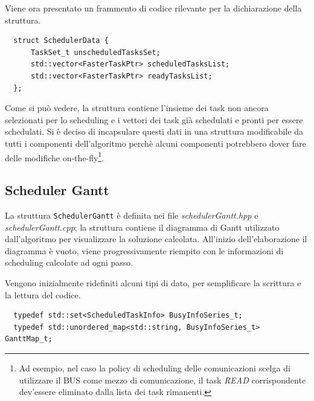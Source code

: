 Viene ora presentato un frammento di codice rilevante per la dichiarazione 
della struttura.
\newline
\begin{verbatim}
  struct SchedulerData {
      TaskSet_t unscheduledTasksSet;
      std::vector<FasterTaskPtr> scheduledTasksList;
      std::vector<FasterTaskPtr> readyTasksList;
  };
\end{verbatim}
Come si può vedere, la struttura contiene l'insieme dei task non ancora 
selezionati per lo scheduling e i vettori dei task già schedulati e pronti per 
essere schedulati. Si è deciso di incapsulare questi dati in una struttura 
modificabile da tutti i componenti dell'algoritmo perchè alcuni componenti 
potrebbero dover fare delle modifiche on-the-fly\footnote{Ad esempio, nel caso 
la policy di scheduling delle comunicazioni scelga di utilizzare il BUS come 
mezzo di comunicazione, il task \emph{READ} corrispondente dev'essere 
eliminato dalla lista dei task rimanenti.}.

\subsection{Scheduler Gantt}
La struttura \verb+SchedulerGantt+ è definita nei file 
\emph{schedulerGantt.hpp} e \emph{schedulerGantt.cpp}; la struttura contiene il 
diagramma di Gantt utilizzato dall'algoritmo per visualizzare la soluzione 
calcolata. All'inizio dell'elaborazione il diagramma è vuoto, viene 
progressivamente riempito con le informazioni di scheduling calcolate ad ogni 
passo.

Vengono inizialmente ridefiniti alcuni tipi di dato, per semplificare la 
scrittura e la lettura del codice.
\newline
\begin{verbatim}
  typedef std::set<ScheduledTaskInfo> BusyInfoSeries_t;
  typedef std::unordered_map<std::string, BusyInfoSeries_t> GanttMap_t;
\end{verbatim}

